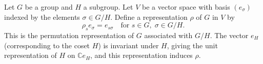 Let $G$ be a group and $H$ a subgroup. Let $V$ be a vector space with basis $(e_\sigma)$ indexed by the elements $\sigma \in G/H$. Define a representation $\rho$ of $G$ in $V$ by
$$\rho_s e_\sigma = e_{s\sigma} \quad \text{for } s \in G,\; \sigma \in G/H.$$
This is the permutation representation of $G$ associated with $G/H$. The vector $e_H$ (corresponding to the coset $H$) is invariant under $H$, giving the unit representation of $H$ on $\mathbb{C} e_H$, and this representation induces $\rho$.
